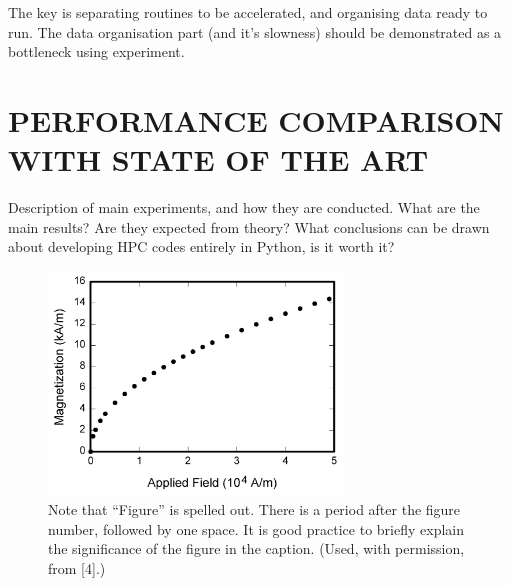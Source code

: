 \documentclass{IEEEcsmag}
\begin{document}
The key is separating routines to be accelerated, and organising data ready to run. The data organisation part (and it's slowness) should be demonstrated as a bottleneck using experiment.

\section{PERFORMANCE COMPARISON WITH STATE OF THE ART}

Description of main experiments, and how they are conducted. What are the main results? Are they expected from theory? What conclusions can be drawn about developing HPC codes entirely in Python, is it worth it?

\begin{figure}
\centerline{\includegraphics[width=18.5pc]{figures/fig1.png}}
\caption{Note that ``Figure'' is spelled out. There is a period after the figure number, followed by one space. It is good practice to briefly explain the significance of the figure in the caption. (Used, with permission, from [4].)}
\end{figure}
\end{document}
